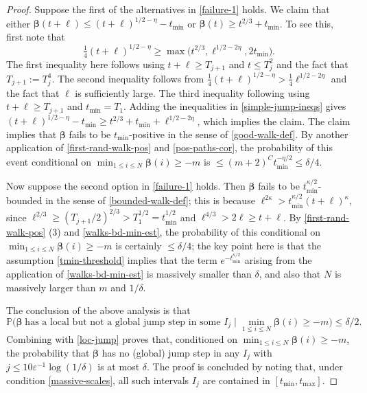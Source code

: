 \documentclass[11pt,reqno]{amsart}
\numberwithin{equation}{section}
\theoremstyle{definition}
\theoremstyle{remark}
\newcommand{\mb}{\mathbb}
\newcommand{\eps}{\varepsilon}
\def\boldbeta{\boldsymbol\beta}
\renewcommand{\le}{\leqslant}
\renewcommand{\ge}{\geqslant}
\begin{document}
\begin{proof}
Suppose the first of the alternatives in \cref{failure-1} holds. We claim that either $\boldbeta(t + \ell) \le (t + \ell)^{1/2 - \eta} - t_{\min}$ or $\boldbeta(t) \ge t^{2/3} + t_{\min}$. To see this, first note that 
\begin{equation}\label{simple-jump-ineqs} \tfrac{1}{4}(t + \ell)^{1/2 - \eta} \ge \max \big(t^{2/3}, \ell^{1/2 - 2\eta} ,2t_{\min}\big).\end{equation} The first inequality here follows using $t + \ell \ge T_{j+1}$ and $t \le T_j^2$ and the fact that $T_{j+1} := T_j^4$. The second inequality follows from $\frac{1}{4}(t + \ell)^{1/2 - \eta} > \frac{1}{4}\ell^{1/2 - 2\eta}$ and the fact that $\ell$ is sufficiently large. The third inequality following using $t + \ell \ge T_{j+1}$ and $t_{\min} = T_1$. Adding the inequalities in \cref{simple-jump-ineqs} gives $(t + \ell)^{1/2 - \eta} - t_{\min} \ge t^{2/3}  + t_{\min}  + \ell^{1/2 - 2\eta}$, which implies the claim. The claim implies that $\boldbeta$ fails to be $t_{\min}$-positive  in the sense of \cref{good-walk-def}. By another application of \cref{first-rand-walk-pos} and \cref{pos-paths-cor}, the probability of this event conditional on $\min_{1 \le i \le N} \boldbeta(i) \ge -m$ is $\le (m + 2)^{C} t_{\min}^{-\eta/2} \le \delta/4$.

Now suppose the second option in \cref{failure-1} holds. Then $\boldbeta$ fails to be $t_{\min}^{\kappa/2}$-bounded in the sense of \cref{bounded-walk-def}; this is because $\ell^{2\kappa} > t_{\min}^{\kappa/2} (t + \ell)^{\kappa}$, since $\ell^{2/3} \ge (T_{j+1}/2)^{2/3} > T^{1/2}_1 = t^{1/2}_{\min}$ and $\ell^{4/3} > 2\ell \ge t + \ell$. By \cref{first-rand-walk-pos} (3) and \cref{walks-bd-min-est}, the probability of this conditional on $\min_{1 \le i \le N} \boldbeta(i) \ge -m$ is certainly $\le \delta/4$; the key point here is that the assumption \cref{tmin-threshold} implies that the term $e^{-t_{\min}^{\kappa/2}}$ arising from the application of \cref{walks-bd-min-est} is massively smaller than $\delta$, and also that $N$ is massively larger than $m$ and $1/\delta$.

The conclusion of the above analysis is that 
\[ \mb{P}\big(\boldbeta \; \mbox{has a local but not a global jump step in some $I_j$} \mid\min_{1 \le i \le N} \boldbeta(i) \ge -m\big) \le \delta/2.\]
Combining with \cref{loc-jump} proves that, conditioned on $\min_{1 \le i \le N} \boldbeta(i) \ge -m$, the probability that $\boldbeta$ has no (global) jump step in any $I_j$ with $j \le 10\eps^{-1} \log(1/\delta)$ is at most $\delta$. The proof is concluded by noting that, under condition \cref{massive-scales}, all such intervals $I_j$ are contained in $[t_{\min}, t_{\max}]$.
\end{proof}
\end{document}

